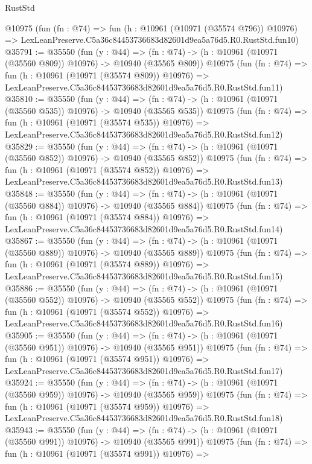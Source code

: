 \begin{lexlean}{RustStd}
\begin{coremodule}
    @10975
    (fun (fn : @74) =>
    fun (h : @10961 (@10971 (@35574 @796)) @10976) =>
    LexLeanPreserve.C5a36c84453736683d82601d9ea5a76d5.R0.RustStd.fun10)
@35791 := @35550
    (fun (y : @44) =>
    (fn : @74) -> (h : @10961 (@10971 (@35560 @809)) @10976) -> @10940 (@35565 @809))
    @10975
    (fun (fn : @74) =>
    fun (h : @10961 (@10971 (@35574 @809)) @10976) =>
    LexLeanPreserve.C5a36c84453736683d82601d9ea5a76d5.R0.RustStd.fun11)
@35810 := @35550
    (fun (y : @44) =>
    (fn : @74) -> (h : @10961 (@10971 (@35560 @535)) @10976) -> @10940 (@35565 @535))
    @10975
    (fun (fn : @74) =>
    fun (h : @10961 (@10971 (@35574 @535)) @10976) =>
    LexLeanPreserve.C5a36c84453736683d82601d9ea5a76d5.R0.RustStd.fun12)
@35829 := @35550
    (fun (y : @44) =>
    (fn : @74) -> (h : @10961 (@10971 (@35560 @852)) @10976) -> @10940 (@35565 @852))
    @10975
    (fun (fn : @74) =>
    fun (h : @10961 (@10971 (@35574 @852)) @10976) =>
    LexLeanPreserve.C5a36c84453736683d82601d9ea5a76d5.R0.RustStd.fun13)
@35848 := @35550
    (fun (y : @44) =>
    (fn : @74) -> (h : @10961 (@10971 (@35560 @884)) @10976) -> @10940 (@35565 @884))
    @10975
    (fun (fn : @74) =>
    fun (h : @10961 (@10971 (@35574 @884)) @10976) =>
    LexLeanPreserve.C5a36c84453736683d82601d9ea5a76d5.R0.RustStd.fun14)
@35867 := @35550
    (fun (y : @44) =>
    (fn : @74) -> (h : @10961 (@10971 (@35560 @889)) @10976) -> @10940 (@35565 @889))
    @10975
    (fun (fn : @74) =>
    fun (h : @10961 (@10971 (@35574 @889)) @10976) =>
    LexLeanPreserve.C5a36c84453736683d82601d9ea5a76d5.R0.RustStd.fun15)
@35886 := @35550
    (fun (y : @44) =>
    (fn : @74) -> (h : @10961 (@10971 (@35560 @552)) @10976) -> @10940 (@35565 @552))
    @10975
    (fun (fn : @74) =>
    fun (h : @10961 (@10971 (@35574 @552)) @10976) =>
    LexLeanPreserve.C5a36c84453736683d82601d9ea5a76d5.R0.RustStd.fun16)
@35905 := @35550
    (fun (y : @44) =>
    (fn : @74) -> (h : @10961 (@10971 (@35560 @951)) @10976) -> @10940 (@35565 @951))
    @10975
    (fun (fn : @74) =>
    fun (h : @10961 (@10971 (@35574 @951)) @10976) =>
    LexLeanPreserve.C5a36c84453736683d82601d9ea5a76d5.R0.RustStd.fun17)
@35924 := @35550
    (fun (y : @44) =>
    (fn : @74) -> (h : @10961 (@10971 (@35560 @959)) @10976) -> @10940 (@35565 @959))
    @10975
    (fun (fn : @74) =>
    fun (h : @10961 (@10971 (@35574 @959)) @10976) =>
    LexLeanPreserve.C5a36c84453736683d82601d9ea5a76d5.R0.RustStd.fun18)
@35943 := @35550
    (fun (y : @44) =>
    (fn : @74) -> (h : @10961 (@10971 (@35560 @991)) @10976) -> @10940 (@35565 @991))
    @10975
    (fun (fn : @74) =>
    fun (h : @10961 (@10971 (@35574 @991)) @10976) =>

\end{coremodule}
\end{lexlean}
